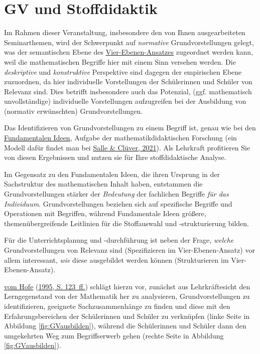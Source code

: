 \documentclass[
  ngerman,
]{scrbook}
\theoremstyle{definition}
\theoremstyle{definition}
\theoremstyle{definition}
\theoremstyle{definition}
\theoremstyle{remark}
\begin{document}
\hypertarget{gv-und-stoffdidaktik}{%
\section{GV und Stoffdidaktik}\label{gv-und-stoffdidaktik}}

Im Rahmen dieser Veranstaltung, insbesondere den von Ihnen ausgearbeiteten Seminarthemen, wird der Schwerpunkt auf \emph{normative} Grundvorstellungen gelegt, was der \textcolor{semanticColor}{semantischen Ebene} des \protect\hyperlink{tab:fragen-ebenen}{Vier-Ebenen-Ansatzes} zugeordnet werden kann, weil die mathematischen Begriffe hier mit einem Sinn versehen werden. Die \emph{deskriptive} und \emph{konstruktive} Perspektive sind dagegen der \textcolor{empiricColor}{empirischen Ebene} zuzuordnen, da hier individuelle Vorstellungen der Schülerinnen und Schüler von Relevanz sind. Dies betrifft insbesondere auch das Potenzial, (ggf. mathematisch unvollständige) individuelle Vorstellungen aufzugreifen bei der Ausbildung von (normativ erwünschten) Grundvorstellungen.

Das Identifizieren von Grundvorstellungen zu einem Begriff ist, genau wie bei den \protect\hyperlink{fundamentale-ideen}{Fundamentalen Ideen}, Aufgabe der mathematikdidaktischen Forschung (ein Modell dafür findet man bei \protect\hyperlink{ref-Salle2021}{Salle \& Clüver, 2021}). Als Lehrkraft profitieren Sie von diesen Ergebnissen und nutzen sie für Ihre stoffdidaktische Analyse.

Im Gegensatz zu den Fundamentalen Ideen, die ihren Ursprung in der Sachstruktur des mathematischen Inhalt haben, entstammen die Grundvorstellungen stärker der \emph{Bedeutung} der fachlichen Begriffe \emph{für das Individuum}. Grundvorstellungen beziehen sich auf spezifische Begriffe und Operationen mit Begriffen, während Fundamentale Ideen größere, themenübergreifende Leitlinien für die Stoffauswahl und -strukturierung bilden.

Für die Unterrichtsplanung und -durchführung ist neben der Frage, \emph{welche} Grundvorstellungen von Relevanz sind (Spezifizieren im Vier-Ebenen-Ansatz) vor allem interessant, \emph{wie} diese ausgebildet werden können (Strukturieren im Vier-Ebenen-Ansatz).

\protect\hyperlink{ref-Hofe:1995}{vom Hofe} (\protect\hyperlink{ref-Hofe:1995}{1995, S. 123~ff.}) schlägt hierzu vor, zunächst aus Lehrkräftesicht den Lerngegenstand von der Mathematik her zu analysieren, Grundvorstellungen zu identifizieren, geeignete Sachzusammenhänge zu finden und diese mit den Erfahrungsbereichen der Schülerinnen und Schüler zu verknüpfen (linke Seite in Abbildung \ref{fig:GVausbilden}), während die Schülerinnen und Schüler dann den umgekehrten Weg zum Begriffserwerb gehen (rechte Seite in Abbildung \ref{fig:GVausbilden}).
\end{document}

